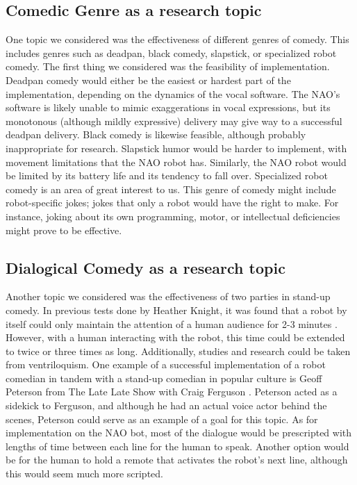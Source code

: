 \subsection{Comedic Genre as a research topic}
One topic we considered was the effectiveness of different genres of comedy.
This includes genres such as deadpan, black comedy, slapstick, or specialized robot comedy.
The first thing we considered was the feasibility of implementation.
Deadpan comedy would either be the easiest or hardest part of the implementation, depending on the dynamics of the vocal software.
The NAO's software is likely unable to mimic exaggerations in vocal expressions, but its monotonous (although mildly expressive) delivery may give way to a successful deadpan delivery.
Black comedy is likewise feasible, although probably inappropriate for research.
Slapstick humor would be harder to implement, with movement limitations that the NAO robot has.
Similarly, the NAO robot would be limited by its battery life and its tendency to fall over.
Specialized robot comedy is an area of great interest to us.
This genre of comedy might include robot-specific jokes; jokes that only a robot would have the right to make.
For instance, joking about its own programming, motor, or intellectual deficiencies might prove to be effective.


\subsection{Dialogical Comedy as a research topic}
Another topic we considered was the effectiveness of two parties in stand-up comedy.
In previous tests done by Heather Knight, it was found that a robot by itself could only maintain the attention of a human audience for 2-3 minutes \cite{OneNote:Anish}.
However, with a human interacting with the robot, this time could be extended to twice or three times as long.
Additionally, studies and research could be taken from ventriloquism.
One example of a successful implementation of a robot comedian in tandem with a stand-up comedian in popular culture is Geoff Peterson from The Late Late Show with Craig Ferguson \cite{GeoffPeterson}.
Peterson acted as a sidekick to Ferguson, and although he had an actual voice actor behind the scenes, Peterson could serve as an example of a goal for this topic.
As for implementation on the NAO bot, most of the dialogue would be prescripted with lengths of time between each line for the human to speak.
Another option would be for the human to hold a remote that activates the robot's next line, although this would seem much more scripted.


